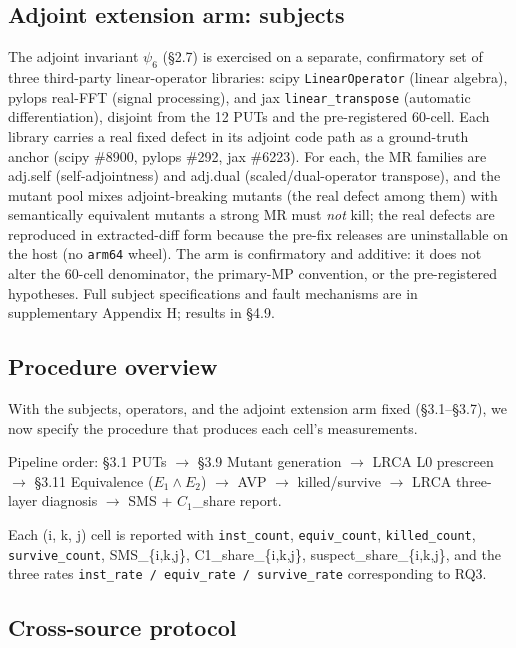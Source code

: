 \documentclass[manuscript,screen,review]{acmart}
\begin{document}
\subsection{Adjoint extension arm: subjects}\label{adjoint-extension-arm-subjects}

The adjoint invariant $\psi_6$ (§2.7) is exercised on a separate,
confirmatory set of three third-party linear-operator libraries:
scipy \texttt{LinearOperator} (linear algebra), pylops real-FFT (signal
processing), and jax \texttt{linear\_transpose} (automatic
differentiation), disjoint from the 12 PUTs and the pre-registered
60-cell. Each library carries a real fixed defect in its adjoint code
path as a ground-truth anchor (scipy \#8900, pylops \#292, jax \#6223).
For each, the MR families are adj.self (self-adjointness) and adj.dual
(scaled/dual-operator transpose), and the mutant pool mixes
adjoint-breaking mutants (the real defect among them) with semantically
equivalent mutants a strong MR must \emph{not} kill; the real defects are
reproduced in extracted-diff form because the pre-fix releases are
uninstallable on the host (no \texttt{arm64} wheel). The arm is
confirmatory and additive: it does not alter the 60-cell denominator, the
primary-MP convention, or the pre-registered hypotheses. Full subject
specifications and fault mechanisms are in supplementary Appendix H;
results in §4.9.

\subsection{Procedure overview}\label{procedure-overview}

With the subjects, operators, and the adjoint extension arm fixed
(§3.1--§3.7), we now specify the procedure that produces each cell's
measurements.

\noindent\textsf{\small Pipeline order: §3.1 PUTs $\to$ §3.9 Mutant generation $\to$ LRCA L0 prescreen $\to$ §3.11 Equivalence ($E_1 \wedge E_2$) $\to$ AVP $\to$ killed/survive $\to$ LRCA three-layer diagnosis $\to$ SMS + $C_1$\_share report.}

Each (i, k, j) cell is reported with \texttt{inst\_count},
\texttt{equiv\_count}, \texttt{killed\_count}, \texttt{survive\_count},
SMS\_\{i,k,j\}, C1\_share\_\{i,k,j\}, suspect\_share\_\{i,k,j\}, and the
three rates \texttt{inst\_rate\ /\ equiv\_rate\ /\ survive\_rate}
corresponding to RQ3.

\subsection{Cross-source protocol}\label{cross-source-v4-protocol-summary}
\end{document}
